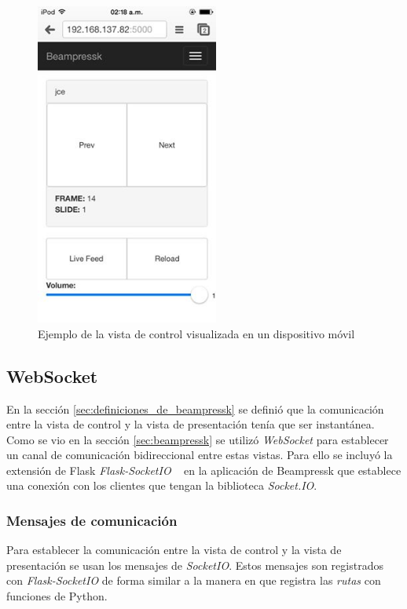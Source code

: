 			\begin{figure}[tb]
				\centering
				\includegraphics[width=6cm]{img/control}
				\caption{Ejemplo de la vista de control visualizada en un dispositivo móvil}
				\label{fig:control}
			\end{figure}						

		\subsection{WebSocket} %
		\label{sub:websocket}

		En la sección \ref{sec:definiciones_de_beampressk} se definió que la comunicación entre la vista de control y la vista de presentación tenía que ser instantánea. Como se vio en la sección \ref{sec:beampressk} se utilizó \textit{WebSocket} para establecer un canal de comunicación bidireccional entre estas vistas. Para ello se incluyó la extensión de Flask \textit{Flask-SocketIO} ~\cite{flasksocket} en la aplicación de Beampressk que establece una conexión con los clientes que tengan la biblioteca \textit{Socket.IO}.

			\subsubsection{Mensajes de comunicación} %
			\label{ssub:mensajes_de_comunicacion}
				Para establecer la comunicación entre la vista de control y la vista de presentación se usan los mensajes de \textit{SocketIO}. Estos mensajes son registrados con \textit{Flask-SocketIO} de forma similar a la manera en que registra las \textit{rutas} con funciones de Python. 

